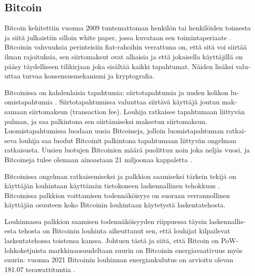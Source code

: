 \subsection{Bitcoin\label{bitcoin}}
\begin{otherlanguage}{english}

Bitcoin kehitettiin vuonna 2009 tuntemattoman henkilön tai henkilöiden toimesta ja siitä julkaistiin silloin white paper, jossa kuvataan sen toimintaperiaate \cite{bitcoin1, satoshibitcoin}. Bitcoinin vahvuuksia perinteisiin fiat-rahoihin verrattuna on, että sitä voi siirtää ilman rajoituksia, sen siirtomaksut ovat alhaisia ja että jokaisella käyttäjillä on pääsy täydelliseen tilikirjaan joka sisältää kaikki tapahtumat. Näiden lisäksi valuuttaa turvaa konsensusmekanismi ja kryptografia.

Bitcoinissa on kahdenlaisia tapahtumia: siirtotapahtumia ja uuden kolikon luomistapahtumia \cite{bitcoin1}. Siirtotapahtumissa valuuttaa siirtävä käyttäjä joutuu maksamaan siirtomaksun (transaction fee). Louhija ratkaisee tapahtumaan liittyvän pulman, ja saa palkintona sen siirtämiseksi maksetun siirtomaksun. Luomistapahtumissa luodaan uusia Bitcoineja, jolloin luomistapahtuman ratkaiseva louhija saa luodut Bitcoinit palkintona tapahtumaan liittyvän ongelman ratkaisusta. Uusien luotujen Bitcoinien määrä puolittuu noin joka neljäs vuosi, ja Bitcoineja tulee olemaan ainoastaan 21 miljoonaa kappaletta \cite{satoshibitcoin}.

Bitcoinissa ongelman ratkaisemiseksi ja palkkion saamiseksi tärkein tekijä on käyttäjän louhintaan käyttämän tietokoneen laskennallinen tehokkuus \cite{bitcoin1}. Bitcoinissa palkkion voittamisen todennäköisyys on suoraan verrannollinen käyttäjän osuuteen koko Bitcoinin louhintaan käytetystä laskentatehosta.

Louhinnassa palkkion saamisen todennäköisyyden riippuessa täysin laskennallisesta tehosta on Bitcoinin louhinta aiheuttanut sen, että louhijat kilpailevat laskentatehossa toistensa kanssa. Johtuen tästä ja siitä, että Bitcoin on PoW-lohkoketjuista markkinaosuudeltaan suurin on Bitcoinin energiavaativuus myös suurin: vuonna 2021 Bitcoinin louhinnan energiankulutus on arvioitu olevan 181.07 terawattituntia \cite{bitcoinenergy}. 


\end{otherlanguage}